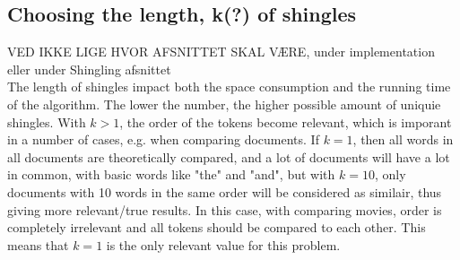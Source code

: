 \subsection{Choosing the length, k(?) of shingles}
VED IKKE LIGE HVOR AFSNITTET SKAL VÆRE, under implementation eller under Shingling afsnittet\\
The length of shingles impact both the space consumption and the running time of the algorithm. The lower the number, the higher possible amount of uniquie shingles. With \(k > 1\), the order of the tokens become relevant, which is imporant in a number of cases, e.g. when comparing documents. If \(k = 1\), then all words in all documents are theoretically compared, and a lot of documents will have a lot in common, with basic words like "the" and "and", but with \(k = 10\), only documents with 10 words in the same order will be considered as similair, thus giving more relevant/true results. In this case, with comparing movies, order is completely irrelevant and all tokens should be compared to each other. This means that \(k=1\) is the only relevant value for this problem.
